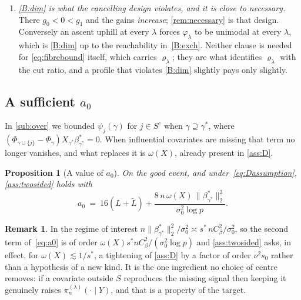 \documentclass[aos]{imsart}
\newcommand{\Ltil}{\widetilde{L}}
\newcommand{\signal}{X_{\gamma^{\ast}}\beta^{\ast}_{\gamma^{\ast}}}
\theoremstyle{plain}
\newtheorem{proposition}{Proposition}[section]
\theoremstyle{definition}
\newtheorem{remark}{Remark}[section]
\begin{document}
\begin{enumerate}[label=(\roman*),leftmargin=2.6em]
        between consecutive gains must exceed the relative reduction the
        larger makes in the residual. A geometrically decaying coefficient
        profile satisfies it; a profile with ties does not, and
        \cref{sub:sstar} shows that the gap really does degrade when it
        fails.
        \item \emph{\ref{B:dim} is what the cancelling design violates, and
        it is close to necessary.} There $g_0<0<g_1$ and the gains
        \emph{increase}; \cref{rem:necessary} is that design. Conversely an
        ascent uphill at every $\lambda$ forces $\varphi_\lambda$ to be
        unimodal at every $\lambda$, which is \ref{B:dim} up to the
        reachability in~\ref{B:exch}. Neither clause is needed for
        \eqref{eq:fibrebound} itself, which carries $\varrho_\lambda$; they are
        what identifies $\varrho_\lambda$ with the cut ratio, and a profile
        that violates \ref{B:dim} slightly pays only slightly.
    \end{enumerate}

    \subsection{A sufficient $a_0$}
    \label{sub:a0}

    In \cref{sub:over} we bounded $\psi_j(\gamma)$ for $j\in S^{c}$ when
    $\gamma\supseteq\gamma^{\ast}$, where
    $(\Phi_{\gamma\cup\{j\}}-\Phi_\gamma)\signal=0$. When influential
    covariates are missing that term no longer vanishes, and what replaces it
    is $\omega(X)$, already present in \cref{ass:D}.

    \begin{proposition}[A value of $a_0$]
        \label{prop:a0}
        On the good event, and under~\eqref{eq:Dassumption},
        \cref{ass:twosided} holds with
        \begin{equation}
            \label{eq:a0}
            a_0\ =\ 16(L+\Ltil)
            +\frac{8\,n\,\omega(X)\,
            \|\beta^{\ast}_{\gamma^{\ast}}\|_2^{2}}
            {\sigma_0^{2}\log p} .
        \end{equation}
    \end{proposition}

    \begin{remark}
        \label{rem:a0cost}
        In the regime of interest $n\|\beta^{\ast}_{\gamma^{\ast}}\|_2^{2}
        /\sigma_0^{2}\asymp s^{\ast}\,nC_\beta^{2}/\sigma_0^{2}$, so the
        second term of~\eqref{eq:a0} is of order
        $\omega(X)s^{\ast}nC_\beta^{2}/(\sigma_0^{2}\log p)$ and
        \cref{ass:twosided} asks, in effect, for
        $\omega(X)\lesssim1/s^{\ast}$, a tightening of \cref{ass:D} by a
        factor of order $\nu^{2}s_0$ rather than a hypothesis of a new kind.
        It is the one ingredient no choice of centre removes: if a covariate
        outside $S$ reproduces the missing signal then keeping it genuinely
        raises $\pi_n^{(\lambda)}(\cdot\mid Y)$, and that is a property of
        the target.
    \end{remark}
\end{document}
